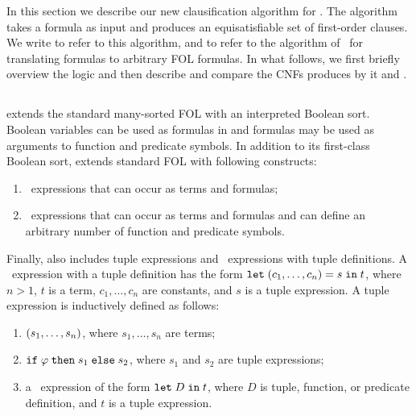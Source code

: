 
In this section we describe our new clausification algorithm for \folb{}. 
The algorithm takes a \folb{} formula as input and produces an equisatisfiable set of first-order clauses. 
We write \nfcnf{} to refer to this algorithm, and \oldcnf{} to refer to the algorithm of~\cite{FOOL} for translating \folb{} formulas to arbitrary FOL formulas. In what follows, we first briefly overview the \folb{} logic and then describe \nfcnf{} and compare the CNFs produces by it and \oldcnf{}.

\subsection{\folb{}}

\folb{} \cite{FOOL} extends the standard many-sorted FOL with an interpreted Boolean sort. 
Boolean variables can be used as formulas in \folb{} and formulas may be used as
arguments to function and predicate symbols. In addition to its first-class Boolean sort,
\folb{} extends standard FOL with following constructs:
\begin{enumerate}
  \item \ITE\ expressions that can occur as terms and formulas;
  \item \LETIN\ expressions that can occur as terms and formulas and can define an arbitrary number of function and predicate symbols.
\end{enumerate}
Finally, \folb{} also includes tuple expressions and \LETIN\ expressions with tuple definitions. 
A \LETIN\ expression with a tuple definition has the form $\mathtt{let}\;{({c_1,\ldots,c_n})}={s}\;\allowbreak\mathtt{in}\;{t}$, where $n > 1$, $t$ is a term, $c_1,\ldots,c_n$ are constants, and $s$ is a tuple expression. A tuple expression is inductively defined as follows:
\begin{enumerate}
  \item $({s_1,\ldots,s_n})$, where $s_1,\ldots,s_n$ are terms;
  \item $\mathtt{if}\;{\varphi}\;\allowbreak\mathtt{then}\;{s_1}\;\allowbreak\mathtt{else}\;{s_2}$, where $s_1$ and $s_2$ are tuple expressions;
  \item a \LETIN\ expression of the form $\mathtt{let}\;{D}\;\allowbreak\mathtt{in}\;{t}$, where $D$ is tuple, function, or predicate definition, and $t$ is a tuple expression.
\end{enumerate}

